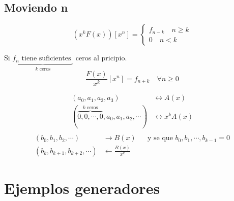 \documentclass[../main.tex]{subfiles}
\begin{document}
\subsection{Moviendo n}%
\label{sub:moviendo_n}

\[
	\left(
		x^kF(x)
	\right)
	[x^n] =
	\begin{cases}
		f_{n-k}\quad n\geq k\\
		0\quad n < k
	\end{cases}
\]

Si
\(
	\underbrace
	{
		f_n
		\text{ tiene suficientes }
	}_
	{
		k \text{ ceros}
	}
\)
ceros al pricipio.
\[
	\frac{F(x)}{x^k} [x^n]
	=f_{n+k} \quad \forall n \geq 0
\]

\begin{align*}
	(a_0,a_1,a_2,a_3) &\longleftrightarrow A(x)\\
	(
	\overbrace
	{
		0,0,\cdots,0
	}^
	{
		k \text{ ceros}
	}
	,a_0,a_1,a_2,\cdots
	)
	&\longleftrightarrow x^kA(x)\\
\end{align*}
\begin{align*}
	(b_0,b_1,b_2,\cdots) &\longrightarrow B(x) &&
	\text{y se que }b_0,b_1,\cdots,b_{k-1}=0\\
	(b_k,b_{k+1},b_{k+2},\cdots) &\longleftarrow \frac{B(x)}{x^k}
\end{align*}

\section{Ejemplos generadores}%
\label{sec:ejemplos_generadores}
\end{document}
